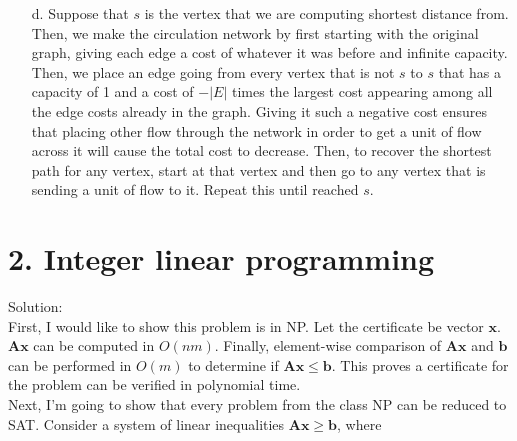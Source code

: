 \documentclass{article}
\begin{document}
\begin{enumerate}
    \item[d.] Suppose that \( s \) is the vertex that we are computing shortest distance from. Then, we make the circulation network by first starting with the original graph, giving each edge a cost of whatever it was before and infinite capacity. Then, we place an edge going from every vertex that is not \( s \) to \( s \) that has a capacity of 1 and a cost of \( -|E| \) times the largest cost appearing among all the edge costs already in the graph. Giving it such a negative cost ensures that placing other flow through the network in order to get a unit of flow across it will cause the total cost to decrease. Then, to recover the shortest path for any vertex, start at that vertex and then go to any vertex that is sending a unit of flow to it. Repeat this until reached \( s \).
\end{enumerate}

\section*{2. Integer linear programming}
Solution:\\
First, I would like to show this problem is in NP. Let the certificate be vector \(\mathbf{x}\). \(\mathbf{A}\mathbf{x}\) can be computed in \(O(nm)\). Finally, element-wise comparison of \(\mathbf{A}\mathbf{x}\) and \(\mathbf{b}\) can be performed in \(O(m)\) to determine if \(\mathbf{A}\mathbf{x} \leq \mathbf{b}\). This proves a certificate for the problem can be verified in polynomial time.\\
Next, I'm going to show that every problem from the class NP can be reduced to SAT. Consider a system of linear inequalities \( \mathbf{A}\mathbf{x} \geq \mathbf{b} \), where
\end{document}
